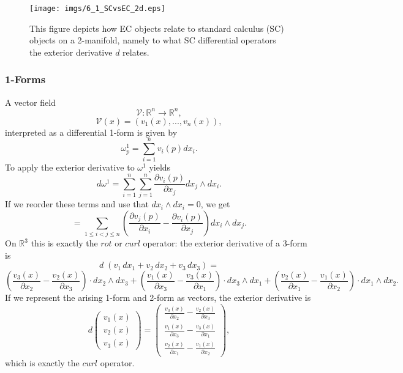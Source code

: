 \begin{figure}
\begin{center}
\texttt{[image: imgs/6\_1\_SCvsEC\_2d.eps]}
\caption{This figure depicts how EC objects relate to standard calculus (SC) objects on a 2-manifold, namely to what SC differential operators the exterior derivative $d$ relates.}
\label{fig::6_1_SC2d}
\end{center}

\end{figure}

\subsubsection{1-Forms}
A vector field 
\[\mathcal V : \mathbb R^n \to \mathbb R^n,\]
\[\mathcal V(x) = (v_1(x),...,v_n(x)),\]
 interpreted as a differential 1-form is given by
\[\omega^1_p = \sum_{i = 1}^n v_i(p) d x_i .\]
To apply the exterior derivative to $\omega^1$ yields
\[d\omega^1 = \sum_{i=1}^n \sum_{j = 1} ^n \frac{\partial v_i(p)}{\partial x_j} dx_j \wedge d x_i.\]
If we reorder these terms and use that $dx_i \wedge dx_i = 0$, we get
\[= \sum_{1\leq i < j \leq n } (\frac{\partial v_j(p)}{\partial x_i} - \frac{\partial v_i(p)}{\partial x_j}) dx_i \wedge d x_j.\]
On $\mathbb R^3$ this is exactly the $rot$ or $curl$ operator: the exterior derivative of a 3-form is
\[d\;(v_1\, dx_1 + v_2\,dx_2 + v_3 \,dx_3) =  \]
\[\left(\frac{v_3(x)}{\partial x_2} -\frac{v_2(x)}{\partial x_3}\right)\cdot dx_2\wedge dx_3 + 
\left(\frac{v_1(x)}{\partial x_3} -\frac{v_3(x)}{\partial x_1}\right)\cdot dx_3\wedge dx_1 + 
\left(\frac{v_2(x)}{\partial x_1} -\frac{v_1(x)}{\partial x_2}\right)\cdot dx_1\wedge dx_2 .\]
If we represent the arising 1-form and 2-form as vectors, the exterior derivative is
\[d \begin{pmatrix}
v_1(x) \\ v_2(x) \\ v_3(x)
\end{pmatrix} = \begin{pmatrix}
\frac{v_3(x)}{\partial x_2} -\frac{v_2(x)}{\partial x_3}\\
\frac{v_1(x)}{\partial x_3} -\frac{v_3(x)}{\partial x_1}\\
\frac{v_2(x)}{\partial x_1} -\frac{v_1(x)}{\partial x_2}
\end{pmatrix},\]
which is exactly the $curl$ operator. 

